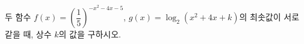 두 함수 $f(x)=\left(\dfrac{1}{5}\right)^{-x^2-4x-5}$, $g(x)=\log_2 (x^2+4x+k)$의 최솟값이 서로 같을 때, 상수 $k$의 값을 구하시오.
